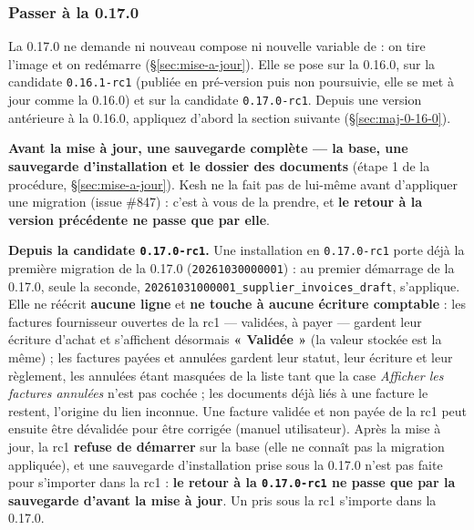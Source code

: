 \documentclass[a4paper,11pt,oneside]{article}
\begin{document}
\subsubsection{Passer à la 0.17.0}\label{sec:maj-0-17-0}

La 0.17.0 ne demande ni nouveau compose ni nouvelle variable de  : on tire l'image et on redémarre (\S\ref{sec:mise-a-jour}). Elle se pose sur la 0.16.0, sur la candidate \texttt{0.16.1-rc1} (publiée en pré-version puis non poursuivie, elle se met à jour comme la 0.16.0) et sur la candidate \texttt{0.17.0-rc1}. Depuis une version antérieure à la 0.16.0, appliquez d'abord la section suivante (\S\ref{sec:maj-0-16-0}).

\begin{keshwarning}
\textbf{Avant la mise à jour, une sauvegarde complète --- la base, une sauvegarde d'installation  et le dossier des documents} (étape 1 de la procédure, \S\ref{sec:mise-a-jour}). Kesh ne la fait pas de lui-même avant d'appliquer une migration (issue \#847) : c'est à vous de la prendre, et \textbf{le retour à la version précédente ne passe que par elle}.
\end{keshwarning}

\begin{sloppypar}
\textbf{Depuis la candidate \texttt{0.17.0-rc1}.} Une installation en \texttt{0.17.0-rc1} porte déjà la première migration de la 0.17.0 (\texttt{20261030000001}) : au premier démarrage de la 0.17.0, seule la seconde, \texttt{20261031000001\_supplier\_invoices\_draft}, s'applique. Elle ne réécrit \textbf{aucune ligne} et \textbf{ne touche à aucune écriture comptable} : les factures fournisseur ouvertes de la rc1 --- validées, à payer --- gardent leur écriture d'achat et s'affichent désormais \textbf{« Validée »} (la valeur stockée est la même) ; les factures payées et annulées gardent leur statut, leur écriture et leur règlement, les annulées étant masquées de la liste tant que la case \emph{Afficher les factures annulées} n'est pas cochée ; les documents déjà liés à une facture le restent, l'origine du lien inconnue. Une facture validée et non payée de la rc1 peut ensuite être dévalidée pour être corrigée (manuel utilisateur). Après la mise à jour, la rc1 \textbf{refuse de démarrer} sur la base (elle ne connaît pas la migration appliquée), et une sauvegarde d'installation prise sous la 0.17.0 n'est pas faite pour s'importer dans la rc1 : \textbf{le retour à la \texttt{0.17.0-rc1} ne passe que par la sauvegarde d'avant la mise à jour}. Un  pris sous la rc1 s'importe dans la 0.17.0.
\end{sloppypar}
\end{document}
